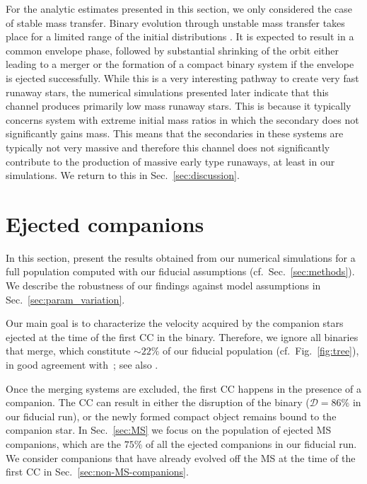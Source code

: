 \documentclass{aa}
\DeclareRobustCommand{\Figref}[1]{Fig.~\ref{#1}}
\DeclareRobustCommand{\Secref}[1]{Sec.~\ref{#1}}
\begin{document}
For the analytic estimates presented in this section, we only
considered the case of stable mass transfer. Binary evolution through
unstable mass transfer takes place for a limited range of the initial
distributions \citep[e.g.,][]{soberman:97,schneider:15}. It is
expected to result in a common envelope phase, followed by substantial
shrinking of the orbit either leading to a merger or the formation of
a compact binary system if the envelope is ejected successfully.
While this is a very interesting pathway to create very fast runaway
stars, the numerical simulations presented later indicate that this
channel produces primarily low mass runaway stars. This is because it typically concerns system with extreme initial mass ratios in which the secondary does not significantly gains mass. This means that the secondaries in these systems are typically not very massive and therefore this channel does not significantly contribute to the production of massive early type runaways, at least in our simulations. We return to this in \Secref{sec:discussion}. 

\section{Ejected companions}
\label{sec:fiducial_res}


In this section, present the results obtained from our numerical simulations for a full population computed with our fiducial assumptions (cf.~\Secref{sec:methods}). We describe the robustness of our findings against model assumptions in \Secref{sec:param_variation}.

Our main goal is to characterize the
velocity acquired by the companion stars ejected at the time of the first CC
in the binary. Therefore, we ignore all binaries that merge, which constitute $\sim$$22\%$ of our fiducial
population (cf.~\Figref{fig:tree}), in good agreement
with~\cite{sana:12,demink:14,zapartas:17,zapartas:17b}; see also \cite{kochanek:14}. 

Once the merging systems are excluded, the first CC happens in the presence
of a companion. The CC can result in either the disruption of the
binary ($\mathcal{D}=86\%$ in our fiducial run), or the newly formed
compact object remains bound to the companion star. In
\Secref{sec:MS} we focus on the population of ejected MS companions,
which are the $75\%$ of all the ejected companions in our fiducial run. We consider companions
that have already evolved off the MS at the time of the first CC in \Secref{sec:non-MS-companions}.
\end{document}
